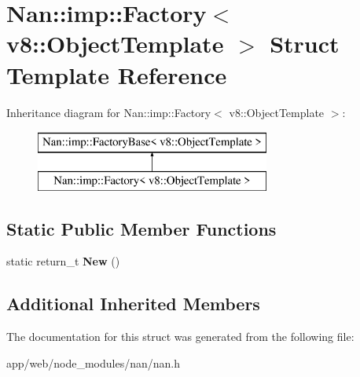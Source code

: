 \hypertarget{struct_nan_1_1imp_1_1_factory_3_01v8_1_1_object_template_01_4}{}\section{Nan\+:\+:imp\+:\+:Factory$<$ v8\+:\+:Object\+Template $>$ Struct Template Reference}
\label{struct_nan_1_1imp_1_1_factory_3_01v8_1_1_object_template_01_4}
Inheritance diagram for Nan\+:\+:imp\+:\+:Factory$<$ v8\+:\+:Object\+Template $>$\+:\begin{figure}[H]
\begin{center}
\leavevmode
\includegraphics[height=2.000000cm]{struct_nan_1_1imp_1_1_factory_3_01v8_1_1_object_template_01_4}
\end{center}
\end{figure}
\subsection*{Static Public Member Functions}
\begin{DoxyCompactItemize}
\item 
\mbox{\label{struct_nan_1_1imp_1_1_factory_3_01v8_1_1_object_template_01_4_ac3b171d5a872f2ac55d1827a25575596}} 
static return\+\_\+t {\bfseries New} ()
\end{DoxyCompactItemize}
\subsection*{Additional Inherited Members}


The documentation for this struct was generated from the following file\+:\begin{DoxyCompactItemize}
\item 
app/web/node\+\_\+modules/nan/nan.\+h\end{DoxyCompactItemize}
